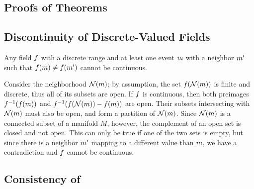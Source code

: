 \documentclass[12pt,a4paper,twoside,openright]{book}
\begin{document}
%
%
%

%

\small\protect\newpage{}



\listoffigures
\listoftables

\begin{appendices}
\chapter{Proofs of Theorems}
\label{proofs}

\section{Discontinuity of Discrete-Valued Fields}

\begin{thm}
  Any field $f$ with a discrete range and at least one event $m$ with a neighbor $m'$ such that $f(m) \neq
  f(m')$ cannot be continuous.
\end{thm}
 Consider the neighborhood $\mathcal{N}(m)$; by assumption, the set $f(\mathcal{N}(m))$ is finite and discrete, thus all of its subsets are open. 
 If $f$ is continuous, then both preimages $f^{-1}(f(m))$ and $f^{-1}(f(\mathcal{N}(m)) - f(m))$ are open.
 Their subsets intersecting with $\mathcal{N}(m)$ must also be open, and form a partition of $\mathcal{N}(m)$.  Since $\mathcal{N}(m)$ is a connected subset of a manifold $M$, however, the complement of an open set is closed and not open.
 This can only be true if one of the two sets is empty, but since there is a neighbor $m'$ mapping to a different value than $m$, we have a contradiction and $f$ cannot be continuous.


\section{Consistency of \calculus{}}
\label{app:consistency}


\end{appendices}
\end{document}
